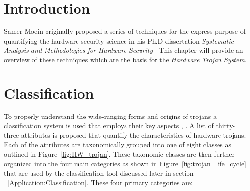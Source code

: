 \label{chapter:quantAnalysis}
\section{Introduction}
Samer Moein originally proposed a series of techniques for the express purpose of quantifying the hardware security science in his Ph.D dissertation \textit{Systematic Analysis and Methodologies for Hardware Security} \cite{SamerDissertation}. This chapter will provide an overview of these techniques which are the basis for the \textit{Hardware Trojan System}.
\section{Classification} \label{section:Classification}
To properly understand the wide-ranging forms and origins of trojans a classification system is used that employs their key aspects \cite{SamerDissertation}, \cite{SamerClassification}. A list of thirty-three attributes is proposed that quantify the characteristics of hardware trojans. Each of the attributes are taxonomically grouped into one of eight classes as outlined in Figure~\ref{fig:HW_trojan}. These taxonomic classes are then further organized into the four main categories as shown in Figure~\ref{fig:trojan_life_cycle} that are used by the classification tool discussed later in section ~\ref{Application:Classification}. These four primary categories are:

